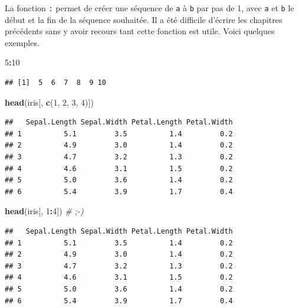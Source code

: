 \documentclass[]{book}
\newenvironment{Shaded}{\begin{snugshade}}{\end{snugshade}}
\newcommand{\CommentTok}[1]{\textcolor[rgb]{0.56,0.35,0.01}{\textit{#1}}}
\newcommand{\DecValTok}[1]{\textcolor[rgb]{0.00,0.00,0.81}{#1}}
\newcommand{\KeywordTok}[1]{\textcolor[rgb]{0.13,0.29,0.53}{\textbf{#1}}}
\newcommand{\NormalTok}[1]{#1}
\newcommand{\OperatorTok}[1]{\textcolor[rgb]{0.81,0.36,0.00}{\textbf{#1}}}
\begin{document}
La fonction \texttt{:} permet de créer une séquence de \texttt{a} à \texttt{b} par pas de 1, avec \texttt{a} et \texttt{b} le début et la fin de la séquence souhaitée. Il a été difficile d'écrire les chapitres précédents sans y avoir recours tant cette fonction est utile. Voici quelques exemples.

\begin{Shaded}
\begin{Highlighting}[]
\DecValTok{5}\OperatorTok{:}\DecValTok{10}
\end{Highlighting}
\end{Shaded}

\begin{verbatim}
## [1]  5  6  7  8  9 10
\end{verbatim}

\begin{Shaded}
\begin{Highlighting}[]
\KeywordTok{head}\NormalTok{(iris[, }\KeywordTok{c}\NormalTok{(}\DecValTok{1}\NormalTok{, }\DecValTok{2}\NormalTok{, }\DecValTok{3}\NormalTok{, }\DecValTok{4}\NormalTok{)])}
\end{Highlighting}
\end{Shaded}

\begin{verbatim}
##   Sepal.Length Sepal.Width Petal.Length Petal.Width
## 1          5.1         3.5          1.4         0.2
## 2          4.9         3.0          1.4         0.2
## 3          4.7         3.2          1.3         0.2
## 4          4.6         3.1          1.5         0.2
## 5          5.0         3.6          1.4         0.2
## 6          5.4         3.9          1.7         0.4
\end{verbatim}

\begin{Shaded}
\begin{Highlighting}[]
\KeywordTok{head}\NormalTok{(iris[, }\DecValTok{1}\OperatorTok{:}\DecValTok{4}\NormalTok{]) }\CommentTok{# ;-)}
\end{Highlighting}
\end{Shaded}

\begin{verbatim}
##   Sepal.Length Sepal.Width Petal.Length Petal.Width
## 1          5.1         3.5          1.4         0.2
## 2          4.9         3.0          1.4         0.2
## 3          4.7         3.2          1.3         0.2
## 4          4.6         3.1          1.5         0.2
## 5          5.0         3.6          1.4         0.2
## 6          5.4         3.9          1.7         0.4
\end{verbatim}
\end{document}
